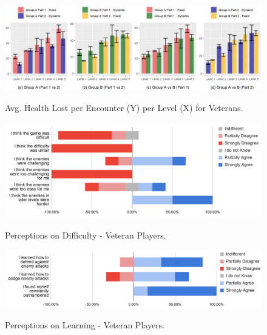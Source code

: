 \begin{figure}[!ht]
    \begin{center}
    \caption{Avg. Health Lost per Encounter (Y) per Level (X) for Veterans.}
        \includegraphics[width=\textwidth]{figures/health_lost_per_encounter-veteran_players.png}
        \label{fig:result-metric-veterans-health-lost-per-encounter}
    \end{center}
\end{figure}



\begin{figure}[!ht]
    \begin{center}
    \caption{Perceptions on Difficulty - Veteran Players.}
        \includegraphics[width=36em]{figures/fig-perception-difficulty-veteran-players.png}
        \label{fig:perception-difficulty-veteran-players}
    \end{center}
\end{figure}

\begin{figure}[!ht]
    \begin{center}
    \caption{Perceptions on Learning - Veteran Players.}
        \includegraphics[width=36em]{figures/fig-perception-learning-veteran-players.png}
        \label{fig:perception-learning-veteran-players}
    \end{center}
\end{figure}

